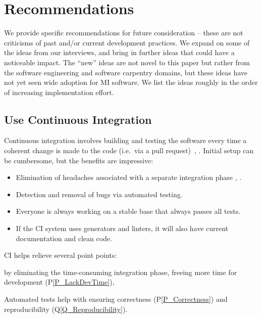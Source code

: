 \documentclass[doubleblind,12pt, 3p, times]{elsarticle}
\newcommand{\ppref}[1]{P\ref{#1}}
\newcommand{\qref}[1]{Q\ref{#1}}
\begin{document}
\section{Recommendations} \label{ch_recommendations}

We provide specific recommendations for future consideration -- these are not
criticisms of past and/or current development practices. We expand on some of
the ideas from our interviews, and bring in further ideas that could have a
noticeable impact. The ``new'' ideas are not novel to this paper but rather from
the software engineering and software carpentry domains, but these ideas have
not yet seen wide adoption for MI software.  We list the ideas roughly in the
order of increasing implementation effort.

\subsection{Use Continuous Integration} \label{Sec_ContinuousIntegration}

Continuous integration involves building and testing the software every time a
coherent change is made to the code (i.e.\ via a pull request)~\cite[p.\ 13]
{HumbleAndFarley2010}, \cite{ShahinEtAl2017, Fowler2006}. Initial setup can be
cumbersome, but the benefits are impressive:

\begin{itemize}
    \item Elimination of headaches associated with a separate integration phase
    \cite{Fowler2006}, \cite[p.\ 20]{HumbleAndFarley2010}.
    \item Detection and removal of bugs \cite{Fowler2006} via
    automated testing.  
    \item Everyone is always working on a stable base that always passes all tests.
    \item If the CI system uses generators and linters, it will also have
    current documentation and clean code.
\end{itemize}

CI helps relieve several point points:
\begin{enumerate*}
\item by eliminating the time-consuming integration phase, 
freeing more time for development (\ppref{P_LackDevTime}),
\item Automated tests help with ensuring
correctness (\ppref{P_Correctness}) and reproducibility
(\qref{Q_Reproducibility}). 
\end{enumerate*}
\end{document}
